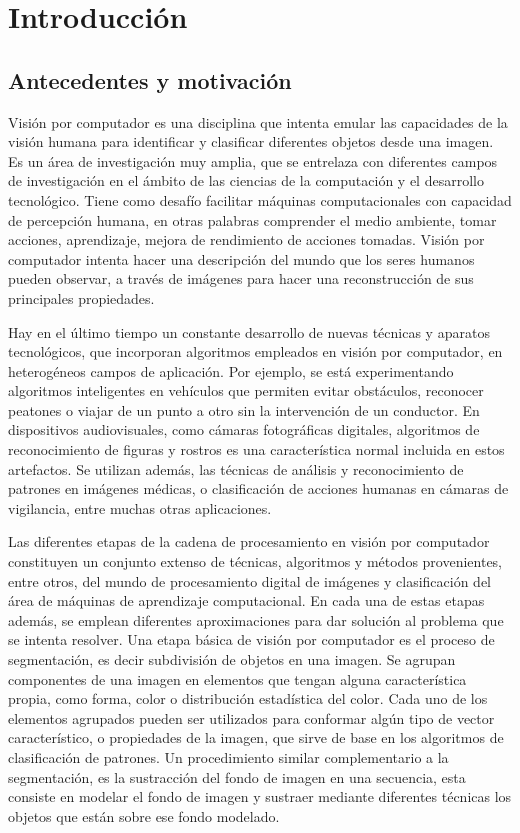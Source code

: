 \chapter{Introducción}
\section{Antecedentes y motivación}
\indent Visión por computador es una disciplina que intenta emular las capacidades de la visión humana para identificar y clasificar diferentes objetos desde una imagen. Es un área de investigación muy amplia, que se entrelaza con diferentes campos de investigación en el ámbito de las ciencias de la computación y el desarrollo tecnológico. Tiene como desafío facilitar máquinas computacionales con capacidad de percepción humana, en otras palabras comprender el medio ambiente, tomar acciones, aprendizaje, mejora de rendimiento de acciones tomadas. Visión por computador intenta hacer una descripción del mundo que los seres humanos pueden observar, a través de imágenes para hacer una reconstrucción de sus principales propiedades.

\indent Hay en el último tiempo un constante desarrollo de nuevas técnicas y aparatos tecnológicos, que incorporan algoritmos empleados en visión por computador, en heterogéneos campos de aplicación. Por ejemplo, se está experimentando algoritmos inteligentes en vehículos que permiten evitar obstáculos, reconocer peatones o viajar de un punto a otro sin la intervención de un conductor. En dispositivos audiovisuales, como cámaras fotográficas digitales, algoritmos de reconocimiento de figuras y rostros es una característica normal incluida en estos artefactos. Se utilizan además, las técnicas de análisis y reconocimiento de patrones en imágenes médicas, o clasificación de acciones humanas en cámaras de vigilancia, entre muchas otras aplicaciones.

\indent Las diferentes etapas de la cadena de procesamiento en visión por computador constituyen un conjunto extenso de técnicas, algoritmos y métodos provenientes, entre otros, del mundo de procesamiento digital de imágenes y clasificación del área de máquinas de aprendizaje computacional. En cada una de estas etapas además, se emplean diferentes aproximaciones para dar solución al problema que se intenta resolver. Una etapa básica de visión por computador es el proceso de segmentación, es decir subdivisión de objetos en una imagen. Se agrupan componentes de una imagen en elementos que tengan alguna característica propia, como forma, color o distribución estadística del color. Cada uno de los elementos agrupados pueden ser utilizados para conformar algún tipo de vector característico, o propiedades de la imagen, que sirve de base en los algoritmos de clasificación de patrones. Un procedimiento similar complementario a la segmentación, es la sustracción del fondo de imagen en una secuencia, esta consiste en modelar el fondo de imagen y sustraer mediante diferentes técnicas los objetos que están sobre ese fondo modelado.


